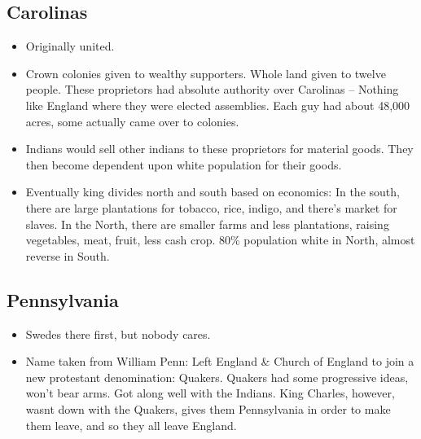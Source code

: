 \documentclass{article}
\begin{document}
    \subsection{Carolinas}
      \begin{itemize}
        \item Originally united.
        \item Crown colonies given to wealthy supporters. Whole land given to twelve people. These proprietors had absolute authority over Carolinas -- Nothing like England where they were elected assemblies. Each guy had about 48,000 acres, some actually came over to colonies.
        \item Indians would sell other indians to these proprietors for material goods. They then become dependent upon white population for their goods.
        \item Eventually king divides north and south based on economics: In the south, there are large plantations for tobacco, rice, indigo, and there's market for slaves. In the North, there are smaller farms and less plantations, raising vegetables, meat, fruit, less cash crop. 80\% population white in North, almost reverse in South. 
      \end{itemize}

    \subsection{Pennsylvania}
      \begin{itemize}
        \item Swedes there first, but nobody cares.
        \item Name taken from William Penn: Left England \& Church of England to join a new protestant denomination: Quakers. Quakers had some progressive ideas, won't bear arms. Got along well with the Indians. King Charles, however, wasnt down with the Quakers, gives them Pennsylvania in order to make them leave, and so they all leave England.
      \end{itemize}
\end{document}

